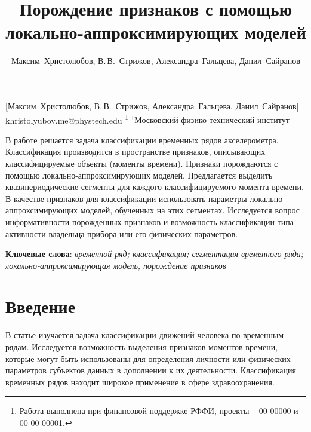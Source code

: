 \documentclass[12pt, twoside]{article}
\begin{document}
\title
    [Порождение признаков с помощью локально-аппроксимирующих моделей] %
    {Порождение признаков с помощью локально-аппроксимирующих моделей}
\author
    [Максим~Христолюбов, В.\,В.~Стрижов] %
    {Максим~Христолюбов, В.\,В.~Стрижов, Александра~Гальцева, Данил~Сайранов} %
    [Максим~Христолюбов, В.\,В.~Стрижов, Александра~Гальцева, Данил~Сайранов] %
\email
    {khristolyubov.me@phystech.edu}
\thanks
    {Работа выполнена при
     финансовой поддержке РФФИ, проекты \No\ -00-00000 и 00-00-00001.}
\organization
    {$^1$Московский физико-технический институт}
\abstract
    {В работе решается задача классификации временных рядов акселерометра. Классификация производится в пространстве признаков, описывающих классифицируемые объекты (моменты времени). Признаки порождаются с помощью локально-аппроксимирующих моделей.  Предлагается выделить квазипериодические сегменты для каждого классифицируемого момента времени. В качестве признаков для классификации использовать параметры локально-аппроксимирующих моделей, обученных на этих сегментах. Исследуется вопрос информативности порожденных признаков и возможность классификации типа активности владельца прибора или его физических параметров.
	
\bigskip
\noindent
\textbf{Ключевые слова}: \emph {временной ряд; классификация; сегментация временного ряда; локально-аппроксимирующая модель, порождение признаков}
}

\maketitle
\linenumbers

\section{Введение}

В статье изучается задача классификации движений человека по временным рядам. Исследуется возможность выделения признаков моментов времени, которые могут быть использованы для определения личности или физических параметров субъектов данных в дополнении к их деятельности. Классификация временных рядов находит широкое применение в сфере здравоохранения.
\end{document}
